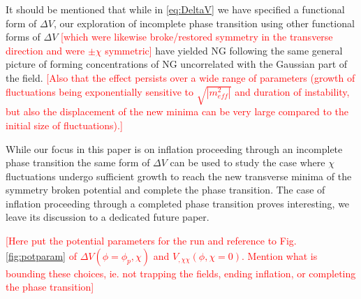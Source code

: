 It should be mentioned that while in \eqref{eq:DeltaV} we have specified a functional form of $\Delta V$, our exploration of incomplete phase transition using other functional forms of $\Delta V$ \textcolor{red}{[which were likewise broke/restored symmetry in the transverse direction and were $\pm\chi$ symmetric]} have yielded NG following the same general picture of forming concentrations of NG uncorrelated with the Gaussian part of the field. \textcolor{red}{[Also that the effect persists over a wide range of parameters (growth of fluctuations being exponentially sensitive to $\sqrt{|m^2_{eff}|}$ and duration of instability, but also the displacement of the new minima can be very large compared to the initial size of fluctuations).]}

\Fpotential

While our focus in this paper is on inflation proceeding through an incomplete phase transition the same form of $\Delta V$ can be used to study the case where $\chi$ fluctuations undergo sufficient growth to reach the new transverse minima of the symmetry broken potential and complete the phase transition. The case of inflation proceeding through a completed phase transition proves interesting, we leave its discussion to a dedicated future paper.

\Fpotparam

\textcolor{red}{[Here put the potential parameters for the run and reference to Fig. \ref{fig:potparam} of $\Delta V(\phi=\phi_p,\chi)$ and $V_{,\chi\chi}(\phi,\chi=0)$. Mention what is bounding these choices, ie. not trapping the fields, ending inflation, or completing the phase transition]}




